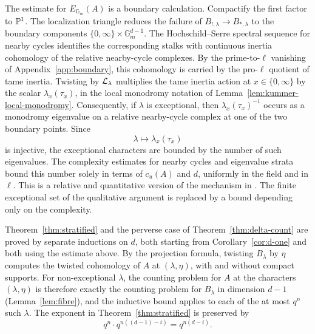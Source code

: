 \documentclass[12pt,reqno]{amsart}
\theoremstyle{definition}
\theoremstyle{plain}
\theoremstyle{definition}
\theoremstyle{remark}
\newcommand{\bbG}{\mathbb{G}}  \newcommand{\bbH}{\mathbb{H}}
\newcommand{\Gm}{\bbG_m}
\newcommand{\cu}{c_u}
\begin{document}
The estimate for \(E_{\Gm}(A)\) is a boundary calculation.  Compactify the first factor to
\(\mathbb{P}^1\).  The localization triangle reduces the failure of \(B_{!,\lambda}\to B_{*,\lambda}\) to
the boundary components \(\{0,\infty\}\times\Gm^{d-1}\).  The Hochschild--Serre spectral sequence
for nearby cycles \cite[\textit{Th\'eor\`emes de finitude}, Lem.~3.11]{SGA45} identifies the
corresponding stalks with continuous inertia cohomology of the relative nearby-cycle complexes.
By the prime-to-\(\ell\) vanishing of Appendix~\ref{app:boundary}, this cohomology is carried by
the pro-\(\ell\) quotient of tame inertia.
Twisting by \(\mathcal{L}_\lambda\) multiplies the tame inertia action at \(x\in\{0,\infty\}\) by the scalar
\(\lambda_x(\tau_x)\), in the local monodromy notation of Lemma~\ref{lem:kummer-local-monodromy}.
Consequently, if \(\lambda\) is exceptional, then \(\lambda_x(\tau_x)^{-1}\) occurs as a monodromy
eigenvalue on a relative nearby-cycle complex at one of the two boundary points.  Since
\[
        \lambda\longmapsto\lambda_x(\tau_x)
\]
is injective, the exceptional characters are bounded by the number of such eigenvalues.  The
complexity estimates for nearby cycles and eigenvalue strata bound this number solely in terms of
\(\cu(A)\) and \(d\), uniformly in the field and in \(\ell\).  This is a relative and quantitative
version of the mechanism in \cite[(6.5.1)]{KatzLaumon1985}.  The finite exceptional set of the
qualitative argument is replaced by a bound depending only on the complexity.

Theorem~\ref{thm:stratified} and the perverse case of Theorem~\ref{thm:delta-count} are proved by
separate inductions on \(d\), both starting from Corollary~\ref{cor:d-one} and both using the estimate
above.  By the projection formula, twisting \(B_\lambda\) by \(\eta\)
computes the twisted cohomology of \(A\) at \((\lambda,\eta)\), with and without compact supports.
For non-exceptional \(\lambda\), the counting problem for \(A\) at the characters \((\lambda,\eta)\)
is therefore exactly the counting problem for \(B_\lambda\) in dimension \(d-1\)
(Lemma~\ref{lem:fibre}), and the inductive bound applies to each of the at most \(q^n\) such
\(\lambda\).  The exponent in Theorem~\ref{thm:stratified} is preserved by
\[
        q^n\cdot q^{n((d-1)-i)}=q^{n(d-i)}.
\]
\end{document}
